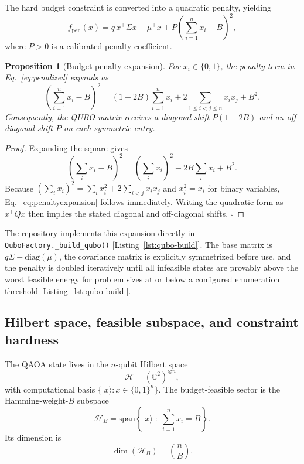 \documentclass[11pt]{article}
\newtheorem{proposition}{Proposition}
\begin{document}
The hard budget constraint is converted into a quadratic penalty, yielding
\begin{equation}
f_{\mathrm{pen}}(x)
= q\,x^\top\Sigma x - \mu^\top x
 + P\left(\sum_{i=1}^n x_i - B\right)^2,
\label{eq:penalized}
\end{equation}
where \(P>0\) is a calibrated penalty coefficient.

\begin{proposition}[Budget-penalty expansion]
For \(x_i \in \{0,1\}\), the penalty term in Eq.~\eqref{eq:penalized} expands as
\begin{equation}
\left(\sum_{i=1}^n x_i - B\right)^2
= (1-2B)\sum_{i=1}^n x_i + 2\sum_{1 \le i < j \le n} x_i x_j + B^2.
\label{eq:penaltyexpansion}
\end{equation}
Consequently, the QUBO matrix receives a diagonal shift \(P(1-2B)\) and an off-diagonal shift \(P\) on each symmetric entry.
\end{proposition}

\begin{proof}
Expanding the square gives
\[
\left(\sum_i x_i - B\right)^2
= \left(\sum_i x_i\right)^2 -2B\sum_i x_i + B^2.
\]
Because \(\left(\sum_i x_i\right)^2 = \sum_i x_i^2 + 2\sum_{i<j}x_ix_j\) and \(x_i^2=x_i\) for binary variables, Eq.~\eqref{eq:penaltyexpansion} follows immediately. Writing the quadratic form as \(x^\top Q x\) then implies the stated diagonal and off-diagonal shifts. \(\square\)
\end{proof}

The repository implements this expansion directly in \texttt{QuboFactory.\_build\_qubo()} [Listing~\ref{lst:qubo-build}]. The base matrix is \(q\Sigma - \mathrm{diag}(\mu)\), the covariance matrix is explicitly symmetrized before use, and the penalty is doubled iteratively until all infeasible states are provably above the worst feasible energy for problem sizes at or below a configured enumeration threshold [Listing~\ref{lst:qubo-build}].

\subsection{Hilbert space, feasible subspace, and constraint hardness}

The QAOA state lives in the \(n\)-qubit Hilbert space
\begin{equation}
\mathcal{H} = \left(\mathbb{C}^2\right)^{\otimes n},
\label{eq:hilbert}
\end{equation}
with computational basis \(\{|x\rangle : x \in \{0,1\}^n\}\). The budget-feasible sector is the Hamming-weight-\(B\) subspace
\begin{equation}
\mathcal{H}_B = \mathrm{span}\left\{ |x\rangle \;:\; \sum_{i=1}^n x_i = B \right\}.
\label{eq:feasiblesubspace}
\end{equation}
Its dimension is
\begin{equation}
\dim(\mathcal{H}_B)=\binom{n}{B}.
\label{eq:subspacesize}
\end{equation}
\end{document}
